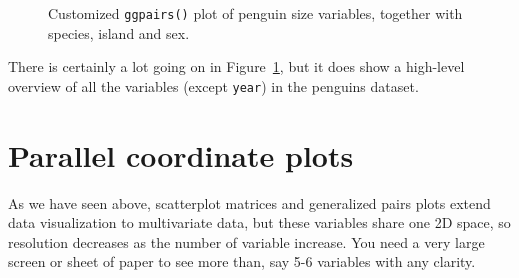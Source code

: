\documentclass[
  letterpaper,
  10pt,
  krantz2]{krantz}
\begin{document}
{\begin{figure}[H]


\caption{\label{fig-peng-ggpairs7}Customized \texttt{ggpairs()} plot of
penguin size variables, together with species, island and sex.}

\end{figure}%

There is certainly a lot going on in Figure~\ref{fig-peng-ggpairs7}, but
it does show a high-level overview of all the variables (except
\texttt{year}) in the penguins dataset.

\section{Parallel coordinate plots}\label{sec-parcoord}

As we have seen above, scatterplot matrices and generalized pairs plots
extend data visualization to multivariate data, but these variables
share one 2D space, so resolution decreases as the number of variable
increase. You need a very large screen or sheet of paper to see more
than, say 5-6 variables with any clarity.

}
\end{document}
